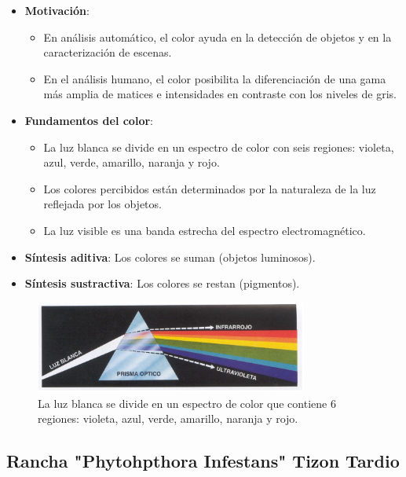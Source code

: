 \begin{itemize}
	\item \textbf{Motivación}:
	\begin{itemize}
		\item En análisis automático, el color ayuda en la detección de objetos y en la caracterización de escenas.
		\item En el análisis humano, el color posibilita la diferenciación de una gama más amplia de matices e intensidades en contraste con los niveles de gris.
	\end{itemize}
	\item \textbf{Fundamentos del color}: 
	\begin{itemize}
		\item La luz blanca se divide en un espectro de color con seis regiones: violeta, azul, verde, amarillo, naranja y rojo.
		\item Los colores percibidos están determinados por la naturaleza de la luz reflejada por los objetos.
		\item La luz visible es una banda estrecha del espectro electromagnético.
	\end{itemize}
	\item \textbf{Síntesis aditiva}: Los colores se suman (objetos luminosos).
	\item \textbf{Síntesis sustractiva}: Los colores se restan (pigmentos).
\end{itemize}
\begin{figure}[H]
	\begin{center}
		\includegraphics[width=0.8\textwidth]{2/figures/vc6.jpeg}
		\caption{La luz blanca se divide en un espectro de color que contiene
			6 regiones: violeta, azul, verde, amarillo, naranja y rojo.}
		\label{}
	\end{center}
	
\end{figure}

\subsection{Rancha "Phytohpthora Infestans" Tizon Tardio \citep*{prom2}}

